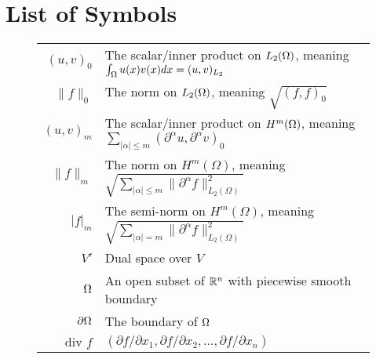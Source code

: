 \section*{List of Symbols}
\begin{center}
\begin{figure}[ht!]
\setlength{\extrarowheight}{10pt}
\begin{tabularx}{\textwidth}{rX}
$(u,v)_0$ &   The scalar/inner product on $L_2(\Omega)$, meaning $\int_\Omega u(x)v(x) dx =(u,v)_{L_2}$ \\
$\|f\|_0$ & The norm on $L_2(\Omega)$, meaning $\sqrt{(f,f)_0}$ \\
$(u,v)_m$ & The scalar/inner product on $H^m(\Omega)$, meaning $ \sum_{|\alpha|\leq m}(\partial ^{\alpha}u, \partial ^{\alpha} v)_0 $\\
$\|f\|_m$ & The norm on $H^m(\Omega)$, meaning $\sqrt{\sum_{|\alpha|\leq m}\|\partial ^\alpha f\|_{L_2(\Omega)}^2}$ \\
$|f|_m$ & The semi-norm on $H^m(\Omega)$, meaning $\sqrt{\sum_{|\alpha|= m}\|\partial ^\alpha f\|_{L_2(\Omega)}^2}$ \\
$V'$ & Dual space over $V$\\
$\Omega$ & An open subset of $\mathbb{R}^n$ with piecewise smooth boundary \\
$\partial\Omega$ & The boundary of $\Omega$\\
$\text{div }f$ & $(\partial f/\partial x_1,\partial f/\partial x_2,\ldots,\partial f/\partial x_n)$ \\
\end{tabularx}
\end{figure}
\end{center}
\vfill
